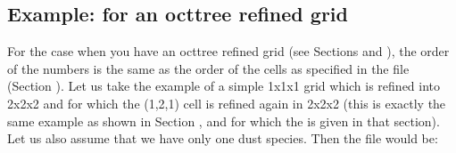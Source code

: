\documentclass[letterpaper,10pt,english]{sphinxmanual}
\begin{document}
\subsection{Example:  for an oct\sphinxhyphen{}tree refined grid}
\label{\detokenize{inputoutputfiles:example-dust-density-inp-for-an-oct-tree-refined-grid}}
For the case when you have an oct\sphinxhyphen{}tree refined grid (see Sections
{\hyperref[\detokenize{inputoutputfiles:sec-amr-grid-oct-tree}]{}} and {\hyperref[\detokenize{gridding:sec-oct-tree-amr}]{}}), the order of the
numbers is the same as the order of the cells as specified in the
 file (Section {\hyperref[\detokenize{inputoutputfiles:sec-grid-input}]{}}).  Let us take the
example of a simple 1x1x1 grid which is refined into 2x2x2 and for which the
(1,2,1) cell is refined again in 2x2x2 (this is exactly the same example as
shown in Section {\hyperref[\detokenize{inputoutputfiles:sec-amr-grid-oct-tree}]{}}, and for which the
 is given in that section). Let us also assume that we have only
one dust species. Then the  file would be:
\end{document}
